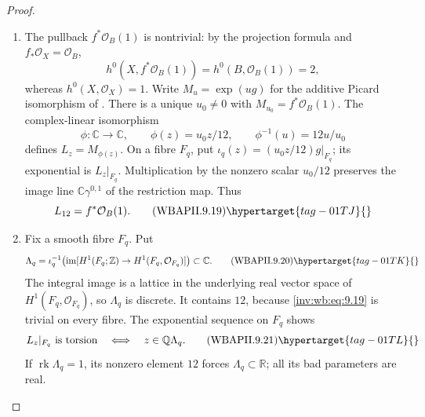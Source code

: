 \begin{proof}

\begin{enumerate}[label=\arabic*.,leftmargin=*]
\item The pullback \(f^*\mathcal O_B(1)\) is nontrivial: by the projection
formula and \(f_*\mathcal O_X=\mathcal O_B\),
\[
 h^0(X,f^*\mathcal O_B(1))=h^0(B,\mathcal O_B(1))=2,
\]
whereas \(h^0(X,\mathcal O_X)=1\). Write \(M_u=\exp(ug)\) for the
additive Picard isomorphism of . There is a unique
\(u_0\ne0\) with \(M_{u_0}=f^*\mathcal O_B(1)\). The complex-linear
isomorphism
\[
 \phi:\mathbb C\longrightarrow\mathbb C,\qquad
 \phi(z)=u_0z/12,\qquad \phi^{-1}(u)=12u/u_0
\]
defines \(L_z=M_{\phi(z)}\). On a fibre \(F_q\), put
\(\iota_q(z)=(u_0z/12)g|_{F_q}\); its exponential is \(L_z|_{F_q}\).
Multiplication by the nonzero scalar \(u_0/12\) preserves the image
line \(\mathbb C\gamma^{0,1}\) of the restriction map. Thus
\[
 L_{12}=f^*\mathcal O_B(1).
\tag{WBAPII.9.19}\hypertarget{tag-01TJ}{}\label{inv:wb:eq:9.19}
\]

\item Fix a smooth fibre \(F_q\).  Put
\[
 \Lambda_q=\iota_q^{-1}\!\left(
 \operatorname{im}[H^1(F_q;\mathbb Z)\to
 H^1(F_q,\mathcal O_{F_q})]\right)\subset\mathbb C.
\tag{WBAPII.9.20}\hypertarget{tag-01TK}{}\label{inv:wb:eq:9.20}
\]
The integral image is a lattice in the underlying real vector space of
\(H^1(F_q,\mathcal O_{F_q})\), so \(\Lambda_q\) is discrete.  It contains
\(12\), because \eqref{inv:wb:eq:9.19} is trivial on every fibre.  The exponential
sequence on \(F_q\) shows
\[
 L_z|_{F_q}\text{ is torsion}
 \quad\Longleftrightarrow\quad z\in\mathbb Q\Lambda_q.
\tag{WBAPII.9.21}\hypertarget{tag-01TL}{}\label{inv:wb:eq:9.21}
\]
If \(\operatorname{rk}\Lambda_q=1\), its nonzero element \(12\) forces
\(\Lambda_q\subset\mathbb R\); all its bad parameters are real.


\end{enumerate}
\end{proof}
